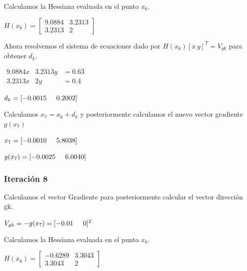 \documentclass[12pt]{article}
\begin{document}
	Calculamos la Hessiana evaluada en el punto $x_6$.
	
	\begin{center}
		$H(x_6)=\left[\begin{array}{cc}
			9.0884  & 3.2313\\
			3.2313 & 2
		\end{array}\right]$		
	\end{center}
	
	Ahora resolvemos el sistema de ecuaciones dado por $H(x_6)[x\ y]^T=V_{gk}$ para obtener $d_k$.
	
	\begin{center}
		$\begin{array}{ccc}
			9.0884x &3.2313y & =0.63\\
			3.2313x & 2y & =0.4
		\end{array}$
		
		$d_k=[-0.0015\hspace{0.5cm}0.2002]$
	\end{center}	
	
	Calculamos $x_7=x_6+d_k$ y posteriormente calculamos el nuevo vector gradiente $g(x_7)$
	
	\begin{center}
		$x_7=[-0.0010 \hspace{0.5cm}5.8038]$
		
		$g(x_7)=[-0.0025\hspace{0.5cm}6.0040]$
	\end{center}

    \subsubsection*{Iteración 8}
	
	Calculamos el vector Gradiente para posteriormente calcular el vector dirección gk.
	
	\begin{center}
		$V_{gk}=-g(x_7)=[-0.01 \hspace{0.5cm}0]^T$			
	\end{center}
	
	Calculamos la Hessiana evaluada en el punto $x_6$.
	
	\begin{center}
		$H(x_6)=\left[\begin{array}{cc}
			-0.6289& 3.3043\\
		    3.3043& 2
		\end{array}\right]$		
	\end{center}
	
\end{document}
